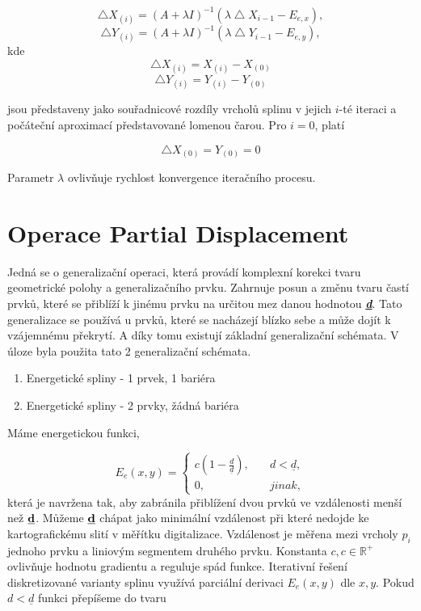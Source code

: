 \documentclass[oneside,12pt,a4paper]{book}
\begin{document}
\begin{equation}
\bigtriangleup X_{(i)} = (A+\lambda I)^{-1}(\lambda \bigtriangleup X_{i-1}- E_{e,x}),
\end{equation}
\begin{equation}
\bigtriangleup Y_{(i)} = (A+\lambda I)^{-1}(\lambda \bigtriangleup Y_{i-1}- E_{e,y}),
\end{equation}
kde 
\begin{equation}
\bigtriangleup X_{(i)} = X_{(i)} - X_{(0)}
\end{equation}
\begin{equation}
\bigtriangleup Y_{(i)} = Y_{(i)} - Y_{(0)}
\end{equation}

jsou představeny jako souřadnicové rozdíly vrcholů splinu v jejich $i$-té iteraci a počáteční aproximací představované lomenou čarou. Pro $i = 0$, platí

\begin{equation}
\bigtriangleup X_{(0)} = Y_{(0)} = 0
\end{equation}

Parametr $\lambda$ ovlivňuje rychlost konvergence iteračního procesu.

\section{Operace Partial Displacement}
Jedná se o generalizační operaci, která provádí komplexní korekci tvaru geometrické polohy a generalizačního prvku. Zahrnuje posun a změnu tvaru častí prvků, které se přiblíží k jinému prvku na určitou mez danou hodnotou \textbf{\emph{\underline{d}}}. Tato generalizace se používá u prvků, které se nacházejí blízko sebe a může dojít k vzájemnému překrytí. A díky tomu existují základní generalizační schémata. V úloze byla použita tato 2 generalizační schémata.

\begin{enumerate}
    \item  Energetické spliny - 1 prvek, 1 bariéra
    \item   Energetické spliny - 2 prvky, žádná bariéra   
\end{enumerate}

Máme energetickou funkci, 

\begin{equation}
 E_e(x,y) =
  \begin{cases}
    c(1-\frac{d}{\underline{d}}),       & \quad d<\underline{d},\\
    0,  & \quad jinak,
  \end{cases}
\end{equation}
která je navržena tak, aby zabránila přiblížení dvou prvků ve vzdálenosti menší než 
$\textbf{\underline{d}}$. Můžeme $\textbf{\underline{d}}$ chápat jako minimální vzdálenost 
při které nedojde ke kartografickému slití v měřítku digitalizace. Vzdálenost je měřena mezi vrcholy 
$p_i $
jednoho prvku a liniovým segmentem druhého prvku. 
Konstanta $c,c\in \mathbb{R^+}$ 
ovlivňuje hodnotu 
gradientu a reguluje spád funkce. Iterativní řešení diskretizované varianty splinu využívá parciální 
derivaci $E_e(x,y)$ dle $x,y$. Pokud $d < \underline{d}$ funkci přepíšeme do tvaru 
\end{document}
